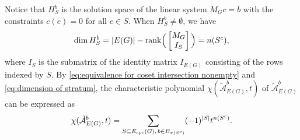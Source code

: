 \documentclass[12pt]{article}%
\renewcommand*{\bm}[1]{#1}%
\numberwithin{equation}{section}
\def\I{\mbox{\rm (\hspace{0.2mm}I\hspace{0.2mm})}\,}
\begin{document}
Notice that $H_S^{\bm b}$ is the solution space of the linear system $M_G\bm c=\bm b$ with the constraints $\bm c(e)=0$ for all $e\in S$. When $H_S^{\bm b}\ne\emptyset$, we have
\begin{equation}\label{eq:dimension of stratum}
\dim H_S^{\bm b}=|E(G)|-{\rm rank}\Big(\begin{bmatrix}M_G\\I_S\end{bmatrix}\Big)=n(S^c),
\end{equation}
where $I_S$ is the submatrix of the  identity matrix $I_{E(G)}$ consisting of the rows indexed by $S$.  By \eqref{eq:equivalence for coset intersection nonempty} and \eqref{eq:dimension of stratum}, the characteristic polynomial $\chi(\tilde{\mathcal{A}}_{E(G)}^{\bm b},t)$ of $\tilde{\mathcal{A}}_{E(G)}^{\bm b}$ can be expressed as
\begin{equation}\label{eq:characteristic polynomial of affine flow arrangement}
\chi(\tilde{\mathcal{A}}_{E(G)}^{\bm b},t)=\sum_{S\subseteq E_{\rm cyc}(G),\,\bm b\in B_{\pi(S^c)}}(-1)^{|S|}t^{n(S^c)}.
\end{equation}
\end{document}
